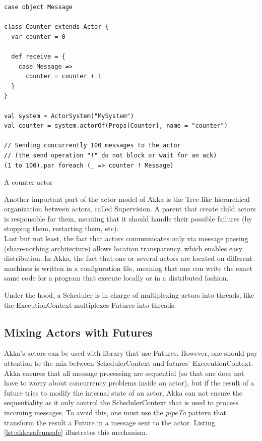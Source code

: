 \begin{listing}[h]
\begin{verbatim}
case object Message

class Counter extends Actor {
  var counter = 0

  def receive = {
    case Message => 
      counter = counter + 1
  }
}

val system = ActorSystem("MySystem")
val counter = system.actorOf(Props[Counter], name = "counter")

// Sending concurrently 100 messages to the actor 
// (the send operation "!" do not block or wait for an ack)
(1 to 100).par foreach (_ => counter ! Message)
\end{verbatim}
\caption{A counter actor}
\label{lst:actorexample}
\end{listing}

Another important part of the actor model of Akka is the Tree-like hierarchical organization between actors, called Supervision.
A parent that create child actors is responsible for them, meaning that it should handle their possible failures (by stopping them,
restarting them, etc).
\\

Last but not least, the fact that actors communicates only via message passing (share-nothing architecture) allows location transparency, which
enables easy distribution. In Akka, the fact that one or several actors are located on different machines is written in a configuration file, meaning that
one can write the exact same code for a program that execute locally or in a distributed fashion.

Under the hood, a Scheduler is in charge of multiplexing actors into threads, like the ExecutionContext multiplexes Futures into threads.

\subsection{Mixing Actors with Futures}
\label{sec:mixingactorfuture}

Akka's actors can be used with library that use Futures. However, one should pay attention to the mix between SchedulerContext 
and futures' ExeceutionContext. Akka ensures that all message processing are sequential (so that one does not have to worry about concurrency problems inside
an actor), but if the result of a future tries to modify the internal state of an actor, Akka can not ensure the sequentiality as it only control the SchedulerContext
that is used to process incoming messages. To avoid this, one must use the \textit{pipeTo} pattern that transform the result a Future in a message sent to the actor.
Listing \ref{lst:akkasafeunsafe} illustrates this mechanism.

